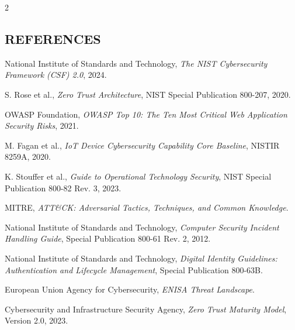 \begin{multicols}{2}
  \subsection*{\centering\uppercase{References}}
  {\small
  \begin{justify}
    \begin{enumerate}[label={\relax[\arabic*]},leftmargin=*,labelsep=0.5em,itemsep=0.20em,parsep=0pt]
      \item National Institute of Standards and Technology, \textit{The NIST Cybersecurity Framework (CSF) 2.0}, 2024.
      \item S. Rose et al., \textit{Zero Trust Architecture}, NIST Special Publication 800-207, 2020.
      \item OWASP Foundation, \textit{OWASP Top 10: The Ten Most Critical Web Application Security Risks}, 2021.
      \item M. Fagan et al., \textit{IoT Device Cybersecurity Capability Core Baseline}, NISTIR 8259A, 2020.
      \item K. Stouffer et al., \textit{Guide to Operational Technology Security}, NIST Special Publication 800-82 Rev. 3, 2023.
      \item MITRE, \textit{ATT\&CK: Adversarial Tactics, Techniques, and Common Knowledge}.
      \item National Institute of Standards and Technology, \textit{Computer Security Incident Handling Guide}, Special Publication 800-61 Rev. 2, 2012.
      \item National Institute of Standards and Technology, \textit{Digital Identity Guidelines: Authentication and Lifecycle Management}, Special Publication 800-63B.
      \item European Union Agency for Cybersecurity, \textit{ENISA Threat Landscape}.
      \item Cybersecurity and Infrastructure Security Agency, \textit{Zero Trust Maturity Model}, Version 2.0, 2023.
    \end{enumerate}
  \end{justify}}
\end{multicols}